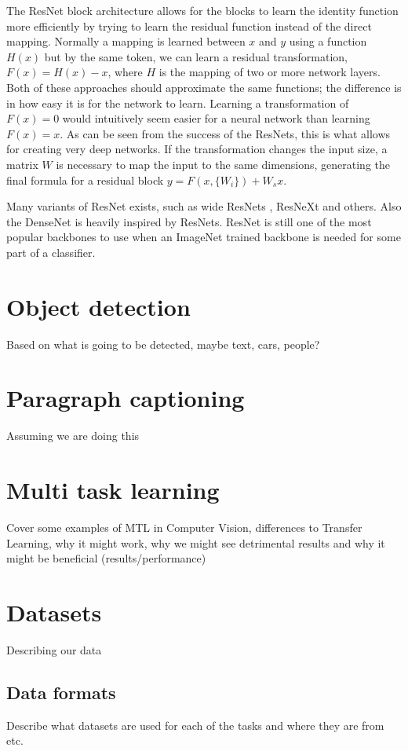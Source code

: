 The ResNet block architecture allows for the blocks to learn the identity function more efficiently by trying to learn the residual function instead of the direct mapping. Normally a mapping is learned between ${x}$ and ${y}$ using a function ${H(x)}$ but by the same token, we can learn a residual transformation, ${F(x) = H(x) - x}$, where ${H}$ is the mapping of two or more network layers. Both of these approaches should approximate the same functions; the difference is in how easy it is for the network to learn. Learning a transformation of ${F(x) = 0}$ would intuitively seem easier for a neural network than learning ${F(x) = x}$. As can be seen from the success of the ResNets, this is what allows for creating very deep networks. If the transformation changes the input size, a matrix ${W}$ is necessary to map the input to the same dimensions, generating the final formula for a residual block ${y = F(x, \{W_i\}) + W_s x}$.

Many variants of ResNet exists, such as wide ResNets \citep{wideResNet}, ResNeXt \citep{resNext} and others. Also the DenseNet \citep{denseNet} is heavily inspired by ResNets. ResNet is still one of the most popular backbones to use when an ImageNet trained backbone is needed for some part of a classifier.


\chapter{Object detection}
Based on what is going to be detected, maybe text, cars, people?
\chapter{Paragraph captioning}
Assuming we are doing this
\chapter{Multi task learning}
Cover some examples of MTL in Computer Vision, differences to Transfer Learning, why it might work, why we might see detrimental results and why it might be beneficial (results/performance)

\chapter{Datasets}
Describing our data
\section{Data formats}
Describe what datasets are used for each of the tasks and where they are from etc.

